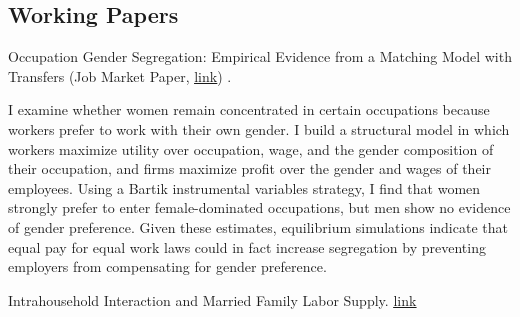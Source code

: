 \documentclass[10pt,letterpaper]{article}
\renewenvironment{itemize}{
  \begin{list}{}{
    \setlength{\leftmargin}{1.5em}
    \setlength{\itemsep}{0.25em}
    \setlength{\parskip}{0pt}
    \setlength{\parsep}{0.25em}
  }
}{
  \end{list}
}
\begin{document}
\subsection*{Working Papers}
\begin{itemize}
\item { Occupation Gender Segregation: Empirical Evidence from a Matching Model with Transfers (Job Market Paper, \href{https://github.com/MiriamLK/repo/raw/master/paper/Paper_2020_April_v1.pdf}{\underline{link}}) }.
\begin{itemize}
\item {I examine whether women remain concentrated in certain occupations because workers prefer to work with their own gender. I build a structural model in which workers maximize utility over occupation, wage, and the gender composition of their occupation, and firms maximize profit over the gender and wages of their employees. Using a Bartik instrumental variables strategy, I find that women strongly prefer to enter female-dominated occupations, but men show no evidence of gender preference. Given these estimates, equilibrium simulations indicate that equal pay for equal work laws could in fact increase segregation by preventing employers from compensating for gender preference.}
\end{itemize}
%
%
\item { Intrahousehold Interaction and Married Family Labor Supply. \href{https://drive.google.com/file/d/1yG-O6b6oU1yLJThSJ9aXiIwwC4Hgt8Dr/view}{\underline{link}} }
\begin{itemize}

\end{itemize}
\end{itemize}
\end{document}
